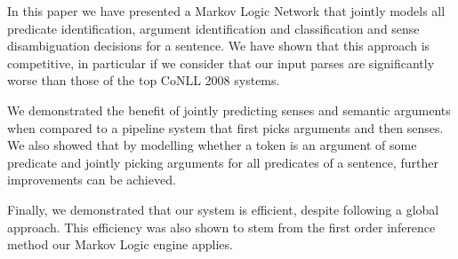 In this paper we have presented a Markov Logic Network that jointly
models all predicate identification, argument identification and
classification and sense disambiguation decisions for a sentence. We
have shown that this approach is competitive, in particular if we consider that our input parses are
significantly worse than those of the top CoNLL 2008 systems. 

We demonstrated the
benefit of jointly predicting senses and semantic arguments when
compared to a pipeline system that first picks arguments and then
senses. We also showed that by modelling whether a token is an
argument of some predicate and jointly picking arguments for all
predicates of a sentence, further improvements can be achieved.  

Finally, we demonstrated that our system is efficient, despite
following a global approach. This efficiency was also shown to stem
from the first order inference method our Markov Logic engine
applies. 

